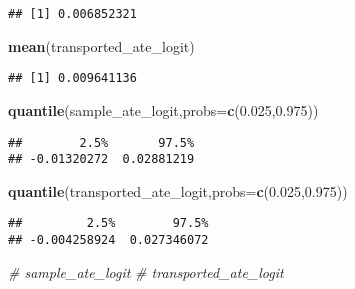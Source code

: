 \documentclass[
]{article}
\newenvironment{Shaded}{\begin{snugshade}}{\end{snugshade}}
\newcommand{\AttributeTok}[1]{\textcolor[rgb]{0.13,0.29,0.53}{#1}}
\newcommand{\CommentTok}[1]{\textcolor[rgb]{0.56,0.35,0.01}{\textit{#1}}}
\newcommand{\FloatTok}[1]{\textcolor[rgb]{0.00,0.00,0.81}{#1}}
\newcommand{\FunctionTok}[1]{\textcolor[rgb]{0.13,0.29,0.53}{\textbf{#1}}}
\newcommand{\NormalTok}[1]{#1}
\begin{document}
\begin{verbatim}
## [1] 0.006852321
\end{verbatim}

\begin{Shaded}
\begin{Highlighting}[]
\FunctionTok{mean}\NormalTok{(transported\_ate\_logit)}
\end{Highlighting}
\end{Shaded}

\begin{verbatim}
## [1] 0.009641136
\end{verbatim}

\begin{Shaded}
\begin{Highlighting}[]
\FunctionTok{quantile}\NormalTok{(sample\_ate\_logit,}\AttributeTok{probs=}\FunctionTok{c}\NormalTok{(}\FloatTok{0.025}\NormalTok{,}\FloatTok{0.975}\NormalTok{))}
\end{Highlighting}
\end{Shaded}

\begin{verbatim}
##        2.5%       97.5% 
## -0.01320272  0.02881219
\end{verbatim}

\begin{Shaded}
\begin{Highlighting}[]
\FunctionTok{quantile}\NormalTok{(transported\_ate\_logit,}\AttributeTok{probs=}\FunctionTok{c}\NormalTok{(}\FloatTok{0.025}\NormalTok{,}\FloatTok{0.975}\NormalTok{))}
\end{Highlighting}
\end{Shaded}

\begin{verbatim}
##         2.5%        97.5% 
## -0.004258924  0.027346072
\end{verbatim}

\begin{Shaded}
\begin{Highlighting}[]
\CommentTok{\# sample\_ate\_logit}
\CommentTok{\# transported\_ate\_logit}
\end{Highlighting}
\end{Shaded}
\end{document}
